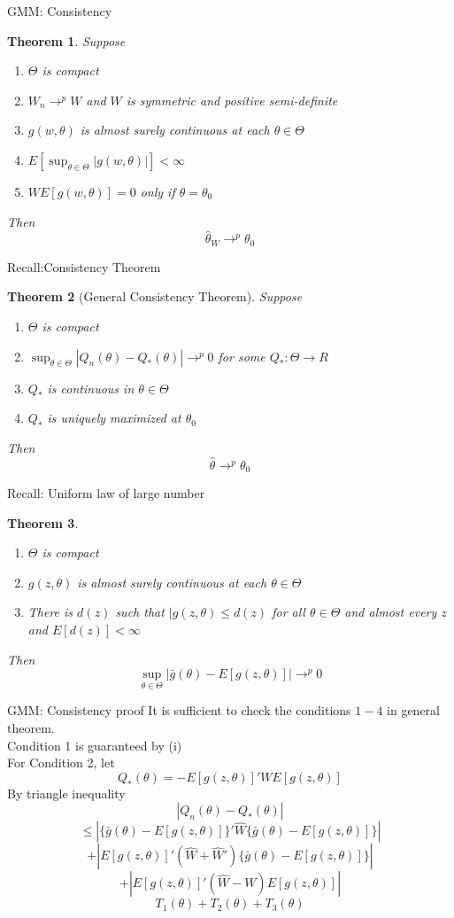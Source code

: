 \documentclass{beamer}
\newtheorem{thm}{Theorem}[subsection]
\begin{document}
\begin{frame}{GMM: Consistency}
	\begin{thm}
		Suppose
		\begin{enumerate}
		\item $\Theta$ is compact
		\item $W_n \rightarrow^p W$ and $W$ is symmetric and positive semi-definite
		\item $g(w,\theta)$ is almost surely continuous at each $\theta \in \Theta$
		\item $E[\sup_{\theta \in \Theta} |g(w,\theta)|] < \infty$
		\item $WE[g(w,\theta)] = 0$ only if $\theta = \theta_0$
		\end{enumerate}
		Then
		\[\hat{\theta}_W \rightarrow^p \theta_0\]
	\end{thm}
\end{frame}
\begin{frame}{Recall:Consistency Theorem}
	\begin{thm}[General Consistency Theorem]
		Suppose
		\begin{enumerate}
				\item $\Theta$ is compact
				\item $\sup_{\theta \in \Theta} |Q_n(\theta) - Q_{*} (\theta)| \rightarrow^p 0$ for some $Q_*:\Theta \rightarrow R$
				\item $Q_*$ is continuous in $\theta \in \Theta$
				\item $Q_*$ is uniquely maximized at $\theta_0$
		\end{enumerate}
		Then 
		\[\hat{\theta} \rightarrow^p \theta_0\]
	\end{thm}
\end{frame}
\begin{frame}{Recall: Uniform law of large number}
	\begin{thm}
		\begin{enumerate}
				\item $\Theta$ is compact
				\item $g(z,\theta)$ is almost surely continuous at each $\theta \in \Theta$
				\item There is $d(z)$ such that $|g(z,\theta) \leq d(z)$ for all $\theta \in \Theta$ and almost every $z$ and $E[d(z)] < \infty$
		\end{enumerate}
		Then 
		\[\sup_{\theta \in \Theta} |\bar{g}(\theta) - E[g(z,\theta)]| \rightarrow^p 0\]
	\end{thm}
\end{frame}
\begin{frame}{GMM: Consistency proof}
	It is sufficient to check the conditions $1-4$ in general theorem. \\
	Condition 1 is guaranteed by (i) \\
	For Condition 2, let
	\[Q_*(\theta) = -E[g(z,\theta)]'WE[g(z,\theta)]\]
	By triangle inequality
	\[|Q_n(\theta) - Q_*(\theta)|\]
	\[\leq |\{\bar{g}(\theta) - E[g(z,\theta)]\}' \hat{W} \{\bar{g}(\theta) - E[g(z,\theta)]\}|\]
	\[+|E[g(z,\theta)]'(\hat{W} + \hat{W}') \{\bar{g}(\theta) - E[g(z,\theta)]\}|\]
	\[+|E[g(z,\theta)]'(\hat{W} - W)E[g(z,\theta)]|\]
	\[T_1(\theta) + T_2(\theta) + T_3(\theta)\]
\end{frame}
\end{document}
